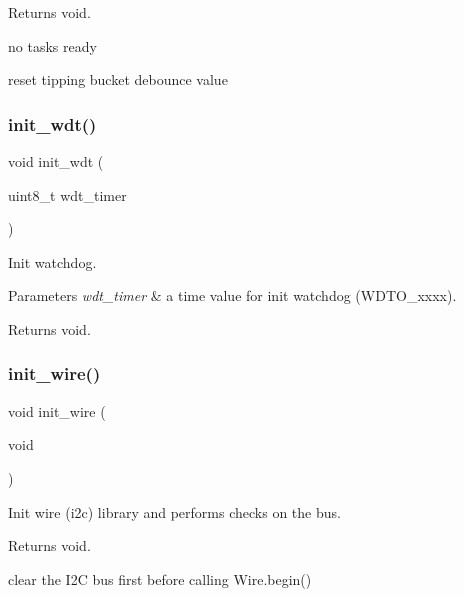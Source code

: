 \begin{DoxyReturn}{Returns}
void. 
\end{DoxyReturn}
no tasks ready

reset tipping bucket debounce value \mbox{\label{i2c-rain_8h_a980e73df66b14b1190bc25da430a4f12}} 
\subsubsection{\texorpdfstring{init\+\_\+wdt()}{init\_wdt()}}
{\footnotesize\ttfamily void init\+\_\+wdt (\begin{DoxyParamCaption}\item[{uint8\+\_\+t}]{wdt\+\_\+timer }\end{DoxyParamCaption})}



Init watchdog. 


\begin{DoxyParams}{Parameters}
{\em wdt\+\_\+timer} & a time value for init watchdog (W\+D\+T\+O\+\_\+xxxx). \\
\hline
\end{DoxyParams}
\begin{DoxyReturn}{Returns}
void. 
\end{DoxyReturn}
\mbox{\label{i2c-rain_8h_a7c21452937863fa02a29654247eef09b}} 
\subsubsection{\texorpdfstring{init\+\_\+wire()}{init\_wire()}}
{\footnotesize\ttfamily void init\+\_\+wire (\begin{DoxyParamCaption}\item[{void}]{ }\end{DoxyParamCaption})}



Init wire (i2c) library and performs checks on the bus. 

\begin{DoxyReturn}{Returns}
void. 
\end{DoxyReturn}
clear the I2C bus first before calling Wire.\+begin()

